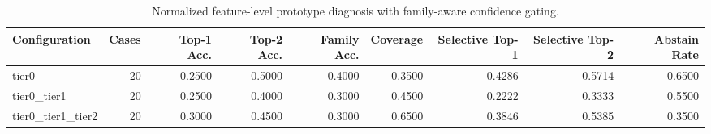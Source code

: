 \begin{table}[t]
\centering
\caption{Normalized feature-level prototype diagnosis with family-aware confidence gating.}
\label{tab:dice_stressor_hierarchical_diagnosis}
\footnotesize
\begin{tabular}{lrrrrrrrr}
\toprule
Configuration & Cases & Top-1 Acc. & Top-2 Acc. & Family Acc. & Coverage & Selective Top-1 & Selective Top-2 & Abstain Rate \\
\midrule
tier0 & 20 & 0.2500 & 0.5000 & 0.4000 & 0.3500 & 0.4286 & 0.5714 & 0.6500 \\
tier0_tier1 & 20 & 0.2500 & 0.4000 & 0.3000 & 0.4500 & 0.2222 & 0.3333 & 0.5500 \\
tier0_tier1_tier2 & 20 & 0.3000 & 0.4500 & 0.3000 & 0.6500 & 0.3846 & 0.5385 & 0.3500 \\
\bottomrule
\end{tabular}

\end{table}
